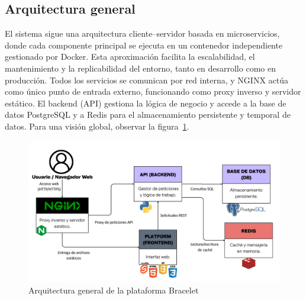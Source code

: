 \documentclass[12pt, a4paper]{article}
\begin{document}
\subsection{Arquitectura general}


El sistema sigue una arquitectura cliente--servidor basada en microservicios, donde cada componente principal se ejecuta en un contenedor independiente gestionado por Docker. Esta aproximación facilita la escalabilidad, el mantenimiento y la replicabilidad del entorno, tanto en desarrollo como en producción. Todos los servicios se comunican por red interna, y NGINX actúa como único punto de entrada externo, funcionando como proxy inverso y servidor estático. El backend (API) gestiona la lógica de negocio y accede a la base de datos PostgreSQL y a Redis para el almacenamiento persistente y temporal de datos. Para una visión global, observar la figura~\ref{fig:diagramaGeneral}.


\begin{figure}[htbp]
	\centering
	\includegraphics[width=1\textwidth]{images/diagramaGeneral.png}
	\caption[Ejemplo]{Arquitectura general de la plataforma Bracelet}
	\label{fig:diagramaGeneral}
\end{figure}
\end{document}
